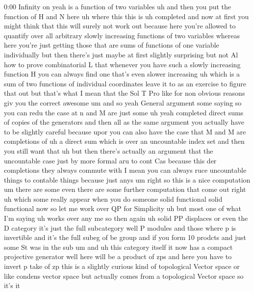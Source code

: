 \begin{unfinished}{0:00}
Infinity
on  yeah  is  a  function  of  two  variables
uh  and  then  you  put  the  function  of  H
and  N  here  uh  where  this  this  is  uh
completed
and  now  at  first  you  might  think  that
this  will  surely  not  work  out  because
here  you're  allowed  to  quantify  over  all
arbitrary  slowly  increasing  functions  of
two  variables  whereas  here  you're  just
getting  those  that  are  sums  of  functions
of  one  variable
individually  but  then  there's  just  maybe
at  first  slightly  surprising  but  not  Al
how  to  prove  combinatorial  L  that
whenever  you  have  such  a  slowly
increasing  function  H  you  can  always
find  one  that's  even  slower  increasing
uh  which  is  a  sum  of  two  functions  of
individual
coordinates  leave  it  to  as  an  exercise
to  figure  that
out  but  that's  what  I  mean  that  the  Sol
T  Pro  like  for  non  obvious  reasons  giv
you  the  correct
awesome
um  and  so  yeah  General  argument  some
saying  so  you  can  redu  the  case  at  n  and
M  are  just
some
uh  yeah  completed  direct  sums  of  copies
of  the  generators  and
then  all  as  the  same  argument  you
actually  have  to  be  slightly  careful
because  upor  you  can  also  have  the  case
that  M  and  M  are  completions
of  uh  a  direct  sum  which  is  over  an
uncountable  index  set  and  then  you  still
want  that  uh  but  then  there's  actually
an  argument
that  the  uncountable  case  just  by  more
formal  aru  to  cont
Cas  because  this  der  completions  they
always  commute  with  I  mean  you  can
always  ruce  uncountable  things  to
contable  things
because
just  anys
um  right  so  this  is  a  nice  computation
um  there  are  some
even  there  are  some  further  computation
that  come  out  right  uh  which  some  really
appear  when  you  do  someone  solid
functional  solid  functional
now  so  let  me  work  over
QP  for
Simplicity  uh  but  most  one  of  what  I'm
saying  uh  works  over
any
me
so  then  again  uh  solid  PP  displaces  or
even  the  D
category  it's  just  the  full  subcategory
well  P  modules  and  those  where  p  is
invertible  and  it's  the  full  subeg  of  be
group  and  if  you  form  10  prodcts  and
just  some  St  was  in  the
sub
um
and  uh  this  category  itself  it  now  has  a
compact  projective
generator  well  here  will  be  a  product  of
zps  and  here  you  have  to  invert  p  take
of
zp  this  is  a  slightly  curious  kind  of
topological  Vector  space  or  like  condens
vector  space  but  actually  comes  from  a
topological  Vector  space  so  it's  it

\end{unfinished}
